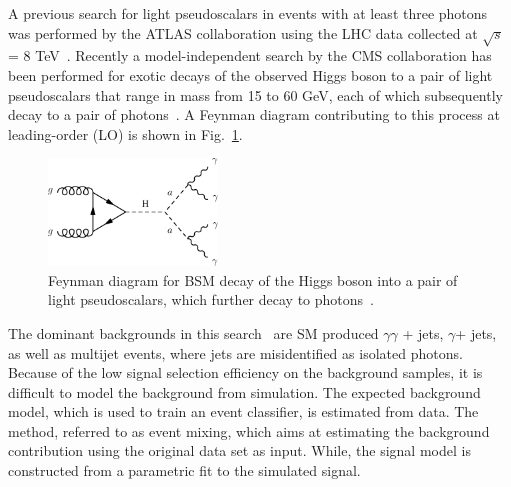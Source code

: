 \documentclass{blois}
\begin{document}
A previous search for light pseudoscalars in events with at least three photons was performed by the ATLAS collaboration using the LHC data collected at $\sqrt{s}$= 8 TeV~\cite{4gamma_atlas}. Recently a model-independent search by the CMS collaboration has been performed for exotic decays of the observed Higgs boson to a pair of light pseudoscalars that range in mass from 15 to 60 GeV, each of which subsequently decay to a pair of photons~\cite{CMS-PAS-HIG-21-003}. A Feynman diagram contributing to this
process at leading-order (LO) is shown in Fig.~\ref{fig:exo_diagrams}.

 \begin{figure}[!htb]
    \begin{center}
        \includegraphics[width=0.4\textwidth]{CMS-PAS-HIG-21-003_Figure_001.png}
        \caption{
             Feynman diagram for BSM decay of the Higgs boson into a pair of light pseudoscalars, which further decay to photons~\protect\cite{CMS-PAS-HIG-21-003}.
        }
        \label{fig:exo_diagrams}
    \end{center}
\end{figure}

The dominant backgrounds in this search~\cite{CMS-PAS-HIG-21-003} are SM produced $\gamma\gamma$ + jets, $\gamma$+ jets, as well as multijet events, where jets are misidentified as isolated photons. Because of the low signal selection efficiency on the background samples, it is difficult to model
the background from simulation. The expected background model, which is used to train an
event classifier, is estimated from data. The method, referred to as event mixing, which aims at estimating the background contribution using the original data set as input. While, the signal model is constructed from a parametric fit to the simulated signal.
\end{document}
